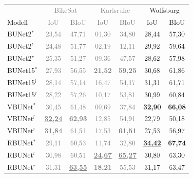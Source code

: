\begin{table}[ht]
	\centering
	\begin{tabular}{l|cc|cc|cc}
        & \multicolumn{2}{c|}{\textcolor{gray}{BikeSat}} & \multicolumn{2}{c|}{\textcolor{gray}{Karlsruhe}} & \multicolumn{2}{c}{Wolfsburg} \\
		Modell & \textcolor{gray}{\ac{IoU}} & \textcolor{gray}{\ac{BIoU}} & \textcolor{gray}{\ac{IoU}} & \textcolor{gray}{\ac{BIoU}} & \ac{IoU} & \ac{BIoU} \\
		\midrule
        BUNet2$^*$ & \textcolor{gray}{23,54} & \textcolor{gray}{47,71} & \textcolor{gray}{01,30} & \textcolor{gray}{34,80} &  28,44 & 57,30 \\
        BUNet2$^l$ & \textcolor{gray}{24,48} & \textcolor{gray}{51,77} & \textcolor{gray}{02,19} & \textcolor{gray}{12,11} &  29,92 & 59,64 \\
        BUNet2$^r$ & \textcolor{gray}{25,35} & \textcolor{gray}{51,27} & \textcolor{gray}{09,36} & \textcolor{gray}{47,57} &  28,62 & 57,98 \\
		\midrule

        BUNet15$^*$ & \textcolor{gray}{27,93} & \textcolor{gray}{56,55} & \textcolor{gray}{\textbf{21,52}} & \textcolor{gray}{\textbf{59,25}} &  30,68 & 61,86 \\
        BUNet15$^l$ & \textcolor{gray}{28,14} & \textcolor{gray}{57,14} & \textcolor{gray}{16,47} & \textcolor{gray}{54,17} &  31,31 & 61,71 \\
        BUNet15$^r$ & \textcolor{gray}{28,22} & \textcolor{gray}{57,26} & \textcolor{gray}{10,17} & \textcolor{gray}{53,81} &  30,99 & 60,84 \\
		\midrule

        VBUNet$^*$ & \textcolor{gray}{30,45} & \textcolor{gray}{61,48} & \textcolor{gray}{09,69} & \textcolor{gray}{37,84} &  \textbf{32,90} & \textbf{66,08} \\
        VBUNet$^l$ & \textcolor{gray}{\underline{\textbf{32,24}}} & \textcolor{gray}{\textbf{62,93}} & \textcolor{gray}{12,85} & \textcolor{gray}{54,91} &  22,79 & 50,18 \\
        VBUNet$^r$ & \textcolor{gray}{\textbf{31,84}} & \textcolor{gray}{61,51} & \textcolor{gray}{17,53} & \textcolor{gray}{\textbf{61,51}} &  27,53 & 56,97 \\
		\midrule

        RBUNet$^*$ & \textcolor{gray}{29,11} & \textcolor{gray}{60,53} & \textcolor{gray}{11,74} & \textcolor{gray}{32,80} &  \underline{\textbf{34,42}} & \textbf{67,74} \\
        RBUNet$^l$ & \textcolor{gray}{30,98} & \textcolor{gray}{60,51} & \textcolor{gray}{\underline{\textbf{24,67}}} & \textcolor{gray}{\underline{\textbf{65,27}}} &  30,80 & 63,30 \\
        RBUNet$^r$ & \textcolor{gray}{31,31} & \textcolor{gray}{\underline{\textbf{63,55}}} & \textcolor{gray}{\textbf{18,21}} & \textcolor{gray}{55,53} &  31,17 & 63,47 \\
		\midrule


\end{tabular}
\end{table}
